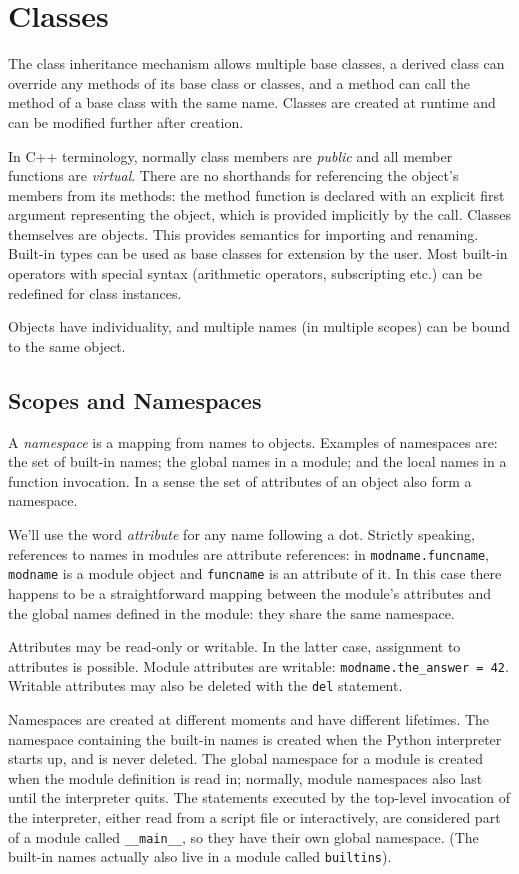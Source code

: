 \section{Classes}

The class inheritance mechanism allows multiple base classes,
a derived class can override any methods of its base class or classes,
and a method can call the method of a base class with the same name.
Classes are created at runtime and can be modified further after creation.

In C++ terminology, normally class members are \emph{public}
and all member functions are \emph{virtual}.
There are no shorthands for referencing the object's members from its methods:
the method function is declared with an explicit first argument
representing the object,
which is provided implicitly by the call.
Classes themselves are objects.
This provides semantics for importing and renaming.
Built-in types can be used as base classes for extension by the user.
Most built-in operators with special syntax
(arithmetic operators, subscripting etc.)
can be redefined for class instances.

Objects have individuality,
and multiple names (in multiple scopes) can be bound to the same object.


\subsection{Scopes and Namespaces}

A \emph{namespace} is a mapping from names to objects.
Examples of namespaces are:
the set of built-in names; the global names in a module;
and the local names in a function invocation.
In a sense the set of attributes of an object also form a namespace.

We'll use the word \emph{attribute} for any name following a dot.
Strictly speaking, references to names in modules are attribute references:
in \verb=modname.funcname=,
\verb=modname= is a module object and \verb=funcname= is an attribute of it.
In this case there happens to be a straightforward mapping between
the module's attributes and the global names defined in the module:
they share the same namespace.

Attributes may be read-only or writable.
In the latter case, assignment to attributes is possible.
Module attributes are writable: \verb+modname.the_answer = 42+.
Writable attributes may also be deleted with the \verb=del= statement.

Namespaces are created at different moments and have different lifetimes.
The namespace containing the built-in names
is created when the Python interpreter starts up, and is never deleted.
The global namespace for a module
is created when the module definition is read in;
normally, module namespaces also last until the interpreter quits.
The statements executed by the top-level invocation of the interpreter,
either read from a script file or interactively,
are considered part of a module called \verb=__main__=,
so they have their own global namespace.
(The built-in names actually also live in a module called \verb=builtins=).

